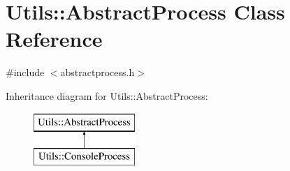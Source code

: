 \hypertarget{class_utils_1_1_abstract_process}{\section{\-Utils\-:\-:\-Abstract\-Process \-Class \-Reference}
\label{class_utils_1_1_abstract_process}
}


{\ttfamily \#include $<$abstractprocess.\-h$>$}

\-Inheritance diagram for \-Utils\-:\-:\-Abstract\-Process\-:\begin{figure}[H]
\begin{center}
\leavevmode
\includegraphics[height=2.000000cm]{class_utils_1_1_abstract_process}
\end{center}
\end{figure}
